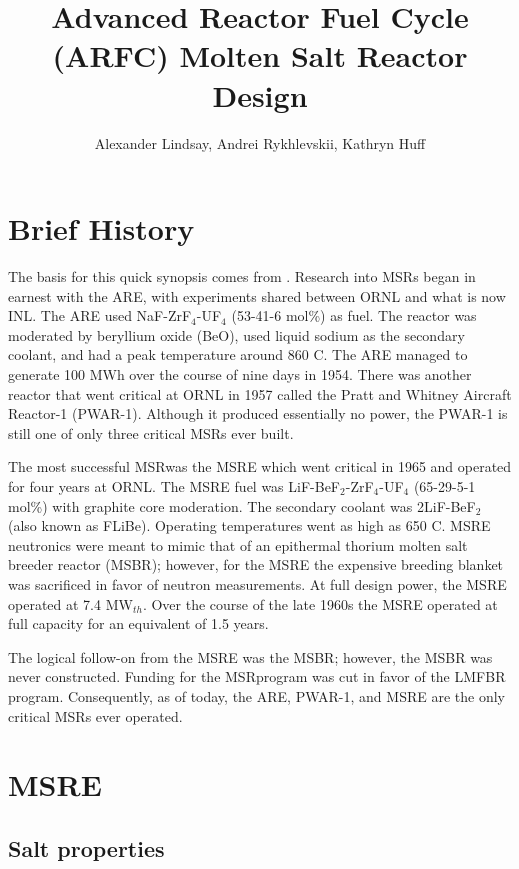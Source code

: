 \documentclass{article}
\title{Advanced Reactor Fuel Cycle (ARFC) Molten Salt Reactor Design}
\author{Alexander Lindsay, Andrei Rykhlevskii, Kathryn Huff} %
\let\Oldsection\section
\renewcommand{\section}{\FloatBarrier\Oldsection}
\let\Oldsubsection\subsection
\renewcommand{\subsection}{\FloatBarrier\Oldsubsection}
\begin{document}
\maketitle

\section{Brief History}

The basis for this quick synopsis comes from \cite{wiki:Molten_salt_reactor}. 
Research into \glspl{MSR} began in earnest with the \gls{ARE}, with experiments 
shared between \gls{ORNL} and what is now \gls{INL}. The \gls{ARE} used 
NaF-ZrF$_4$-UF$_4$ (53-41-6 mol\%) as fuel. The reactor was moderated by 
beryllium oxide (BeO), used liquid sodium as the secondary coolant, and had a 
peak temperature around 860 \textdegree C. The \gls{ARE} managed to generate
100 MWh over the course of nine days in 1954. There was another reactor that
went critical at \gls{ORNL} in 1957 called the Pratt and Whitney Aircraft Reactor-1
(PWAR-1). Although it produced essentially no power, the PWAR-1 is still one of
only three critical MSRs ever built.

The most successful \gls{MSR}was the \gls{MSRE} which went
critical in 1965 and operated for four years at \gls{ORNL}. The \gls{MSRE} fuel was
LiF-BeF$_2$-ZrF$_4$-UF$_4$ (65-29-5-1 mol\%) with graphite core moderation. The
secondary coolant was 2LiF-BeF$_2$ (also known as FLiBe). Operating temperatures
went as high as 650 \textdegree C. \gls{MSRE} neutronics were meant to mimic that of
an epithermal thorium molten salt breeder reactor (MSBR); however, for the \gls{MSRE}
the expensive breeding blanket was sacrificed in favor of neutron
measurements. At full design power, the \gls{MSRE} operated at 7.4 MW$_{th}$. Over the
course of the late 1960s the \gls{MSRE} operated at full capacity for an equivalent of
1.5 years.

The logical follow-on from the \gls{MSRE} was the MSBR; however, the MSBR was never
constructed. Funding for the \gls{MSR}program was cut in favor of the
\gls{LMFBR} program. Consequently, as of today, the \gls{ARE},
PWAR-1, and \gls{MSRE} are the only critical MSRs ever operated.

\section{\gls{MSRE}}

\subsection{Salt properties}
\end{document}
